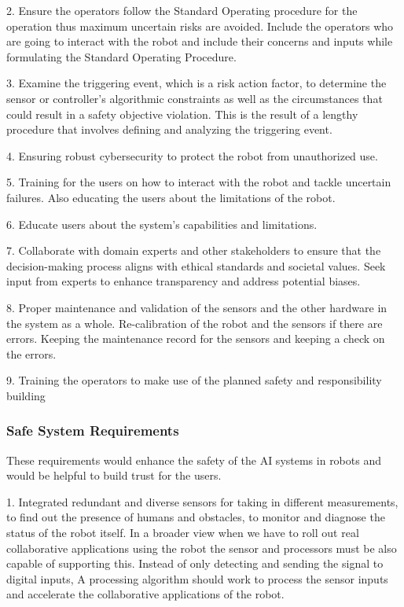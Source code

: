 {2. Ensure the operators follow the Standard Operating procedure for the operation thus maximum uncertain risks are avoided. Include the operators who are going to interact with the robot and include their concerns and inputs while formulating the Standard Operating Procedure.

3. Examine the triggering event, which is a risk action factor, to determine the sensor or controller's algorithmic constraints as well as the circumstances that could result in a safety objective violation. This is the result of a lengthy procedure that involves defining and analyzing the triggering event.

4. Ensuring robust cybersecurity to protect the robot from unauthorized use. 

5. Training for the users on how to interact with the robot and tackle uncertain failures. Also educating the users about the limitations of the robot.

6. Educate users about the system's capabilities and limitations.

7. Collaborate with domain experts and other stakeholders to ensure that the decision-making process aligns with ethical standards and societal values. Seek input from experts to enhance transparency and address potential biases.

8. Proper maintenance and validation of the sensors and the other hardware in the system as a whole. Re-calibration of the robot and the sensors if there are errors. Keeping the maintenance record for the sensors and keeping a check on the errors.

9. Training the operators to make use of the planned safety and responsibility building





{\subsubsection{Safe System Requirements}}

These requirements would enhance the safety of the AI systems in robots and would be helpful to build trust for the users.

1. Integrated redundant and diverse sensors for taking in different measurements, to find out the presence of humans and obstacles, to monitor and diagnose the status of the robot itself. 
In a broader view when we have to roll out real collaborative applications using the robot the sensor and processors must be also capable of supporting this. Instead of only detecting and sending the signal to digital inputs, A processing algorithm should work to process the sensor inputs and accelerate the collaborative applications of the robot.

}
